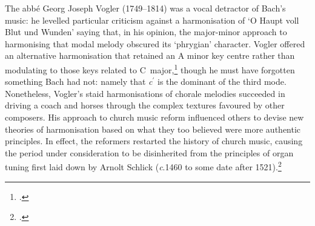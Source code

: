 The abbé Georg Joseph Vogler (1749--1814) was a vocal detractor of Bach's music: he levelled particular criticism against a harmonisation of `O Haupt voll Blut und Wunden' saying that, in his opinion, the major-minor approach to harmonising that modal melody obscured its `phrygian' character.
Vogler offered an alternative harmonisation that retained an A minor key centre rather than modulating to those keys related to C~major,\footcite[160--72]{VoglerChoralSystem1800} though he must have forgotten something Bach had not: namely that \emph{c}$^\prime$ is the dominant of the third mode.
Nonetheless, Vogler's staid harmonisations of chorale melodies succeeded in driving a coach and horses through the complex textures favoured by other composers.
His approach to church music reform influenced others to devise new theories of harmonisation based on what they too believed were more authentic principles.
In effect, the reformers restarted the history of church music, causing the period under consideration to be disinherited from the principles of organ tuning first laid down by Arnolt Schlick (\emph{c}.1460 to some date after 1521).\footcite[129--34]{LindleyEarly16thCenturyKeyboard1974}
%
\nowidow[2]

